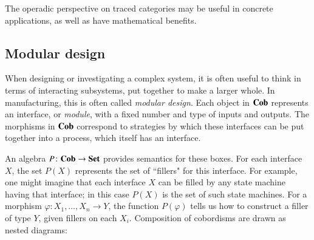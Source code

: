 \documentclass[12pt,oneside,article,draft]{memoir}
\begin{document}
The operadic perspective on traced categories may be useful in concrete applications, as well as have mathematical benefits.

\subsection{Modular design}

When designing or investigating a complex system, it is often useful to think in terms of interacting subsystems, put together to make a larger whole. In manufacturing, this is often called \emph{modular design}. Each object in $\mathbf{Cob}$ represents an interface, or \emph{module}, with a fixed number and type of inputs and outputs. The morphisms in $\mathbf{Cob}$ correspond to strategies by which these interfaces can be put together into a process, which itself has an interface. 

An algebra $P\colon\mathbf{Cob}\to\mathbf{Set}$ provides semantics for these boxes. For each interface $X$, the set $P(X)$ represents the set of ``fillers" for this interface. For example, one might imagine that each interface $X$ can be filled by any state machine having that interface; in this case $P(X)$ is the set of such state machines. For a morphism $\varphi\colon X_1,\ldots,X_n\to Y$, the function $P(\varphi)$ tells us how to construct a filler of type $Y$, given fillers on each $X_i$. Composition of cobordisms are drawn as nested diagrams:
\end{document}

